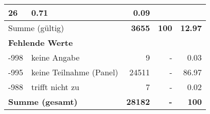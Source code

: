 \begin{longtable}{lXrrr}
       \num{26} &
       \num[round-mode=places,round-precision=2]{0.71} &
         \num[round-mode=places,round-precision=2]{0.09} \\
     \midrule
     \multicolumn{2}{l}{Summe (gültig)} &
       \textbf{\num{3655}} &
     \textbf{\num{100}} &
       \textbf{\num[round-mode=places,round-precision=2]{12.97}} \\
     \multicolumn{5}{l}{\textbf{Fehlende Werte}}\\
       -998 &
       keine Angabe &
         \num{9} &
        - &
         \num[round-mode=places,round-precision=2]{0.03} \\
       -995 &
       keine Teilnahme (Panel) &
         \num{24511} &
        - &
         \num[round-mode=places,round-precision=2]{86.97} \\
       -988 &
       trifft nicht zu &
         \num{7} &
        - &
         \num[round-mode=places,round-precision=2]{0.02} \\
     \midrule
     \multicolumn{2}{l}{\textbf{Summe (gesamt)}} &
          \textbf{\num{28182}} &
        \textbf{-} &
        \textbf{\num{100}} \\
     \bottomrule
     \end{longtable}
     
